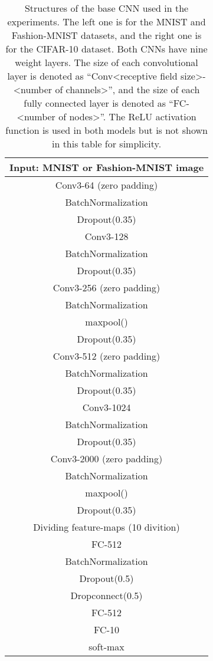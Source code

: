 \documentclass[a4j]{article}
\begin{document}
\begin{table}[t]
  \centering
\caption{Structures of the base CNN used in the experiments. The left one is for the MNIST and Fashion-MNIST datasets, and the right one is for the CIFAR-10 dataset. Both CNNs have nine weight layers. The size of each convolutional layer is denoted as ``Conv<receptive field size>-<number of channels>'', and the size of each fully connected layer is denoted as ``FC-<number of nodes>''. The ReLU activation function is used in both models but is not shown in this table for simplicity. } 
    \label{tb:mainnet}
    \begin{tabular}[t]{|c|} \hline
      Input:  MNIST or Fashion-MNIST image\\ \hline
      Conv3-64 (zero padding)\\
      BatchNormalization\\
      Dropout(0.35)\\
      Conv3-128\\
      BatchNormalization\\
      Dropout(0.35)\\
      Conv3-256 (zero padding)\\
      BatchNormalization\\ \hline
      maxpool()\\ \hline
      Dropout(0.35)\\
      Conv3-512 (zero padding)\\
      BatchNormalization\\
      Dropout(0.35)\\
      Conv3-1024\\
      BatchNormalization\\
      Dropout(0.35)\\
      Conv3-2000 (zero padding)\\
      BatchNormalization\\ \hline
      maxpool()\\ \hline
      Dropout(0.35)\\ \hline\hline
      Dividing feature-maps (10 divition)\\ \hline\hline
      FC-512\\
      BatchNormalization\\
      Dropout(0.5)\\ \hline
      Dropconnect(0.5) \cite{Dropconnect, ChainerDropconnect} \\
FC-512\\ \hline
      FC-10\\ \hline
      soft-max\\ \hline

\end{tabular}
\end{table}
\end{document}
